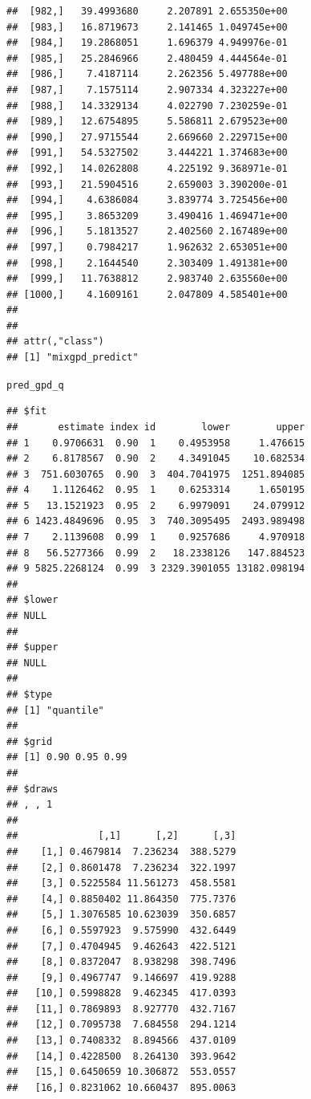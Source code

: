 \documentclass[article]{jss}\usepackage[]{graphicx}\usepackage[]{xcolor}
\makeatletter
\newcommand{\hldef}[1]{\textcolor[rgb]{0.345,0.345,0.345}{#1}}%
\newenvironment{kframe}{%
 \def\at@end@of@kframe{}%
 \ifinner\ifhmode%
  \def\at@end@of@kframe{\end{minipage}}%
  \begin{minipage}{\columnwidth}%
 \fi\fi%
 \def\FrameCommand##1{\hskip\@totalleftmargin \hskip-\fboxsep
 \colorbox{shadecolor}{##1}\hskip-\fboxsep
     \hskip-\linewidth \hskip-\@totalleftmargin \hskip\columnwidth}%
 \MakeFramed {\advance\hsize-\width
   \@totalleftmargin\z@ \linewidth\hsize
   \@setminipage}}%
 {\par\unskip\endMakeFramed%
 \at@end@of@kframe}
\newenvironment{knitrout}{}{} %
\makeatother
\begin{document}
\begin{knitrout}
\begin{kframe}
\begin{verbatim}
##  [982,]   39.4993680     2.207891 2.655350e+00
##  [983,]   16.8719673     2.141465 1.049745e+00
##  [984,]   19.2868051     1.696379 4.949976e-01
##  [985,]   25.2846966     2.480459 4.444564e-01
##  [986,]    7.4187114     2.262356 5.497788e+00
##  [987,]    7.1575114     2.907334 4.323227e+00
##  [988,]   14.3329134     4.022790 7.230259e-01
##  [989,]   12.6754895     5.586811 2.679523e+00
##  [990,]   27.9715544     2.669660 2.229715e+00
##  [991,]   54.5327502     3.444221 1.374683e+00
##  [992,]   14.0262808     4.225192 9.368971e-01
##  [993,]   21.5904516     2.659003 3.390200e-01
##  [994,]    4.6386084     3.839774 3.725456e+00
##  [995,]    3.8653209     3.490416 1.469471e+00
##  [996,]    5.1813527     2.402560 2.167489e+00
##  [997,]    0.7984217     1.962632 2.653051e+00
##  [998,]    2.1644540     2.303409 1.491381e+00
##  [999,]   11.7638812     2.983740 2.635560e+00
## [1000,]    4.1609161     2.047809 4.585401e+00
## 
## 
## attr(,"class")
## [1] "mixgpd_predict"
\end{verbatim}
\begin{alltt}
\hldef{pred_gpd_q}
\end{alltt}
\begin{verbatim}
## $fit
##       estimate index id        lower        upper
## 1    0.9706631  0.90  1    0.4953958     1.476615
## 2    6.8178567  0.90  2    4.3491045    10.682534
## 3  751.6030765  0.90  3  404.7041975  1251.894085
## 4    1.1126462  0.95  1    0.6253314     1.650195
## 5   13.1521923  0.95  2    6.9979091    24.079912
## 6 1423.4849696  0.95  3  740.3095495  2493.989498
## 7    2.1139608  0.99  1    0.9257686     4.970918
## 8   56.5277366  0.99  2   18.2338126   147.884523
## 9 5825.2268124  0.99  3 2329.3901055 13182.098194
## 
## $lower
## NULL
## 
## $upper
## NULL
## 
## $type
## [1] "quantile"
## 
## $grid
## [1] 0.90 0.95 0.99
## 
## $draws
## , , 1
## 
##              [,1]      [,2]      [,3]
##    [1,] 0.4679814  7.236234  388.5279
##    [2,] 0.8601478  7.236234  322.1997
##    [3,] 0.5225584 11.561273  458.5581
##    [4,] 0.8850402 11.864350  775.7376
##    [5,] 1.3076585 10.623039  350.6857
##    [6,] 0.5597923  9.575990  432.6449
##    [7,] 0.4704945  9.462643  422.5121
##    [8,] 0.8372047  8.938298  398.7496
##    [9,] 0.4967747  9.146697  419.9288
##   [10,] 0.5998828  9.462345  417.0393
##   [11,] 0.7869893  8.927770  432.7167
##   [12,] 0.7095738  7.684558  294.1214
##   [13,] 0.7408332  8.894566  437.0109
##   [14,] 0.4228500  8.264130  393.9642
##   [15,] 0.6450659 10.306872  553.0557
##   [16,] 0.8231062 10.660437  895.0063

\end{verbatim}
\end{kframe}
\end{knitrout}
\end{document}
